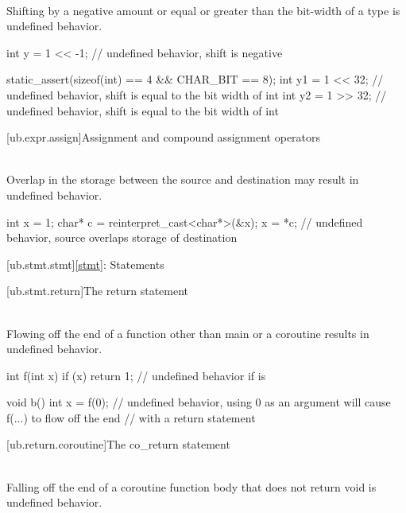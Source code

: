\pnum
{} \\
Shifting by a negative amount or equal or greater than the bit-width of a type is undefined behavior.

\pnum
\begin{example}
\begin{codeblock}
int y = 1 << -1;        // undefined behavior, shift is negative

static_assert(sizeof(int) == 4 && CHAR_BIT == 8);
int y1 = 1 << 32;       // undefined behavior, shift is equal to the bit width of int
int y2 = 1 >> 32;       // undefined behavior, shift is equal to the bit width of int
\end{codeblock}
\end{example}


[ub.expr.assign]{Assignment and compound assignment operators}

\pnum
{} \\
Overlap in the storage between the source and destination may result in undefined behavior.

\pnum
\begin{example}
\begin{codeblock}
int x = 1;
char* c = reinterpret_cast<char*>(&x);
x = *c;         // undefined behavior, source overlaps storage of destination
\end{codeblock}
\end{example}

[ub.stmt.stmt]{\ref{stmt}: Statements}

[ub.stmt.return]{The return statement}

\pnum
{} \\
Flowing off the end of a function other
than main or a coroutine results in undefined behavior.

\pnum
\begin{example}
\begin{codeblock}
int f(int x) {
  if (x)
    return 1;
  // undefined behavior if  is 
}

void b() {
  int x = f(0); // undefined behavior, using 0 as an argument will cause f(...) to flow off the end
                // with a return statement
}
\end{codeblock}
\end{example}

[ub.return.coroutine]{The co_return statement}

\pnum
{} \\
Falling off the end of a coroutine function body that does not return void is undefined behavior.

